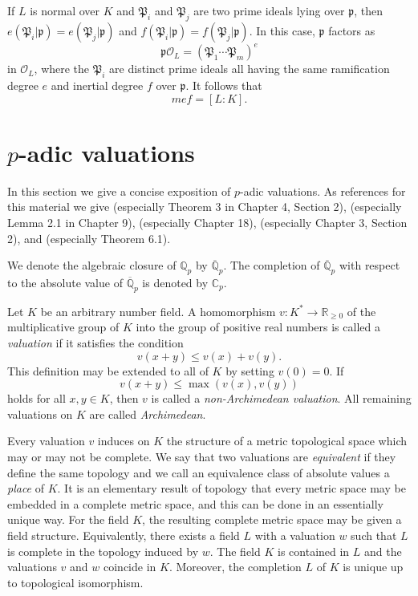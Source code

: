 If $L$ is normal over $K$ and $\mathfrak{P}_i$ and $\mathfrak{P}_j$ are two prime ideals lying over $\mathfrak{p}$, then $e({\mathfrak{P}}_i|\mathfrak{p}) = e({\mathfrak{P}}_j|\mathfrak{p})$ and $f({\mathfrak{P}}_i|\mathfrak{p}) = f({\mathfrak{P}}_j|\mathfrak{p})$. In this case, $\mathfrak{p}$ factors as
\[\mathfrak{p}\mathcal{O}_L = \left( \mathfrak{P}_1 \cdots \mathfrak{P}_m\right)^e\]
in $\mathcal{O}_L$, where the $\mathfrak{P}_i$ are distinct prime ideals all having the same ramification degree $e$ and inertial degree $f$ over $\mathfrak{p}$. It follows that 
\[mef = [L:K].\]


\section{$p$-adic valuations}
\label{sec:pAdicValuations}

In this section we give a concise exposition of $p$-adic valuations. As references for this material we give \cite{BS} (especially Theorem 3 in Chapter 4, Section 2), \cite{Ca} (especially Lemma 2.1 in Chapter 9), \cite{Has2} (especially Chapter 18), \cite{Ko} (especially Chapter 3, Section 2), and \cite{Nark} (especially Theorem 6.1).

We denote the algebraic closure of $\mathbb{Q}_p$ by $\overline{\mathbb{Q}}_p$. The completion of $\overline{\mathbb{Q}}_p$ with respect to the absolute value of $\overline{\mathbb{Q}}_p$ is denoted by $\mathbb{C}_p$.

Let $K$ be an arbitrary number field. A homomorphism $v: K^* \to \mathbb{R}_{\geq 0}$ of the multiplicative group of $K$ into the group of positive real numbers is called a \textit{valuation} if it satisfies the condition
\[v(x+y) \leq v(x) + v(y).\]
This definition may be extended to all of $K$ by setting $v(0) = 0$. If
\[v(x+y) \leq \max(v(x),v(y))\]
holds for all $x,y \in K$, then $v$ is called a \textit{non-Archimedean valuation}. All remaining valuations on $K$ are called \textit{Archimedean}. 

Every valuation $v$ induces on $K$ the structure of a metric topological space which may or may not be complete. We say that two valuations are \textit{equivalent} if they define the same topology and we call an equivalence class of absolute values a \textit{place} of $K$. It is an elementary result of topology that every metric space may be embedded in a complete metric space, and this can be done in an essentially unique way. For the field $K$, the resulting complete metric space may be given a field structure. Equivalently, there exists a field $L$ with a valuation $w$ such that $L$ is complete in the topology induced by $w$. The field $K$ is contained in $L$ and the valuations $v$ and $w$ coincide in $K$. Moreover, the completion $L$ of $K$ is unique up to topological isomorphism.


